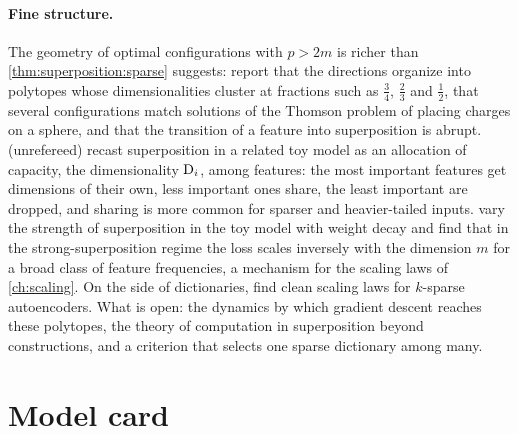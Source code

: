 \begin{refsection}
\paragraph{Fine structure.} The geometry of optimal configurations with $p>2m$ is richer than \cref{thm:superposition:sparse} suggests: \textcite{ElhageEtAl2022} report that the directions organize into polytopes whose dimensionalities cluster at fractions such as $\frac34$, $\frac23$ and $\frac12$, that several configurations match solutions of the Thomson problem of placing charges on a sphere, and that the transition of a feature into superposition is abrupt. \Textcite{ScherlisEtAl2022} (unrefereed) recast superposition in a related toy model as an allocation of capacity, the dimensionality $\mathrm{D}_i$, among features: the most important features get dimensions of their own, less important ones share, the least important are dropped, and sharing is more common for sparser and heavier-tailed inputs. \Textcite{LiuLiuGore2025} vary the strength of superposition in the toy model with weight decay and find that in the strong-superposition regime the loss scales inversely with the dimension $m$ for a broad class of feature frequencies, a mechanism for the scaling laws of \cref{ch:scaling}. On the side of dictionaries, \textcite{GaoEtAl2025} find clean scaling laws for $k$-sparse autoencoders. What is open: the dynamics by which gradient descent reaches these polytopes, the theory of computation in superposition beyond constructions, and a criterion that selects one sparse dictionary among many.

\section{Model card}\label{sec:superposition:card}



\end{refsection}
